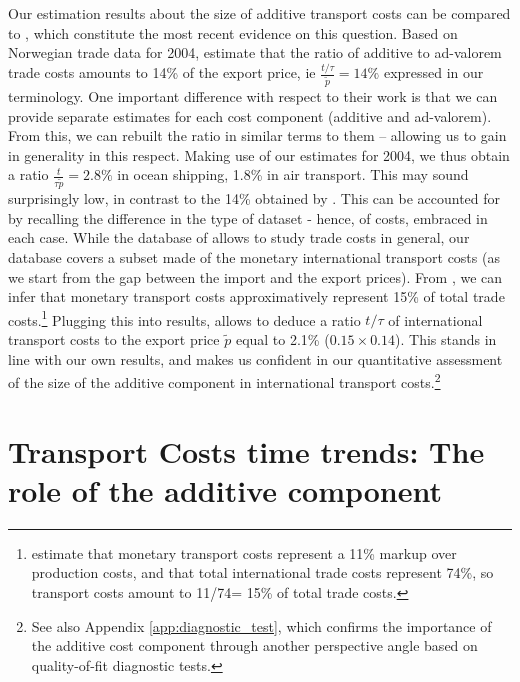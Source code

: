 \documentclass[a4paper,11pt]{article}
\begin{document}
Our estimation results about the size of additive transport costs can be compared to \citet{Irrazabal_2015}, which constitute the most recent evidence on this question. Based on Norwegian trade data for 2004, \citet{Irrazabal_2015} estimate that the ratio of additive to ad-valorem trade costs amounts to 14\% of the export price, ie $\frac{t/\tau}{\widetilde{p}}=14\%$ expressed in our terminology. One important difference with respect to their work is that we can provide separate estimates for each cost component (additive and ad-valorem). From this, we can rebuilt the ratio in similar terms to them -- allowing us to gain in generality in this respect. Making use of our estimates for 2004, we thus obtain a ratio $\frac{t}{\tau\widetilde{p}}=2.8\%$ in ocean shipping, 1.8\% in air transport. This may sound surprisingly low, in contrast to the 14\% obtained by \citet{Irrazabal_2015}. This can be accounted for by recalling the difference in the type of dataset - hence, of costs, embraced in each case. While the database of \citet{Irrazabal_2015} allows to study trade costs in general, our database covers a subset made of the monetary international transport costs (as we start from the gap between the import and the export prices). From \citet{anderson_wincoop_jel}, we can infer that monetary transport costs approximatively represent 15\% of total trade costs.\footnote{\citet{anderson_wincoop_jel} estimate that monetary transport costs represent a 11\% markup over production costs, and that total international trade costs represent 74\%, so transport costs amount to 11/74= 15\% of total trade costs.} Plugging this into \citet{Irrazabal_2015} results, allows to deduce a ratio $t/\tau$ of international transport costs to the export price $\widetilde{p}$ equal to 2.1\% ($0.15\times 0.14$). This stands in line with our own results, and makes us confident in our quantitative assessment of the size of the additive component in international transport costs.\footnote{See also Appendix \ref{app:diagnostic_test}, which confirms the importance of the additive cost component through another perspective angle based on quality-of-fit diagnostic tests.}\smallskip

\section{Transport Costs time trends: The role of the additive component}\label{sec:results_trends}
\end{document}
